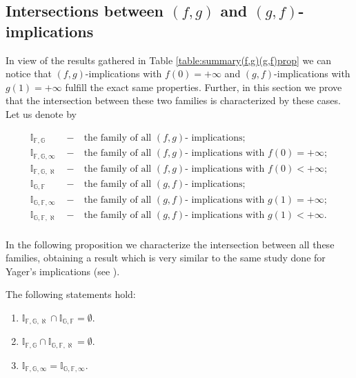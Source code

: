 \subsection{Intersections between $(f,g)$ and $(g,f)$-implications}

In view of the results gathered in Table \ref{table:summary(f,g)(g,f)prop} we can notice that $(f,g)$-implications with $f(0)=+\infty$ and $(g,f)$-implications with $g(1)=+\infty$ fulfill the exact same properties. Further, in this section we prove that the intersection between these two families is characterized by these cases. Let us denote by

\begin{eqnarray*}
	\mathbb{I}_{\mathbb{F},\mathbb{G}} &~-~& \text{the family of all $(f,g)$- implications};\\
	\mathbb{I}_{\mathbb{F},\mathbb{G},\infty} &~-~& \text{the family of all $(f,g)$- implications with $f(0)=+\infty$};\\
	\mathbb{I}_{\mathbb{F},\mathbb{G},\aleph} &~-~& \text{the family of all $(f,g)$- implications with $f(0)<+\infty$};\\
	\mathbb{I}_{\mathbb{G},\mathbb{F}} &~-~& \text{the family of all $(g,f)$- implications};\\
	\mathbb{I}_{\mathbb{G},\mathbb{F},\infty} &~-~& \text{the family of all $(g,f)$- implications with $g(1)=+\infty$};\\
	\mathbb{I}_{\mathbb{G},\mathbb{F},\aleph} &~-~& \text{the family of all $(g,f)$- implications with $g(1)<+\infty$}.\\
\end{eqnarray*}

In the following proposition we characterize the intersection between all these families, obtaining a result which is very similar to the same study done for Yager's implications (see \cite[Proposition 4.4.1]{Baczynski2008}).

\begin{proposition}
	The following statements hold:
	\begin{enumerate}[label=(\roman*)]
		\item $\mathbb{I}_{\mathbb{F},\mathbb{G},\aleph} \cap \mathbb{I}_{\mathbb{G},\mathbb{F}} = \emptyset$.
		\item $\mathbb{I}_{\mathbb{F},\mathbb{G}} \cap \mathbb{I}_{\mathbb{G},\mathbb{F},\aleph} = \emptyset$.
		\item $\mathbb{I}_{\mathbb{F},\mathbb{G},\infty}  = \mathbb{I}_{\mathbb{G},\mathbb{F},\infty}$. 
	\end{enumerate}
\end{proposition}

